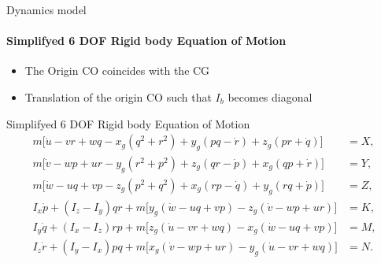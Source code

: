 \begin{frame}{Dynamics model}
	\framesubtitle{Simplifyed 6 DOF Rigid body Equation of Motion}
	\begin{itemize}
		\item The Origin CO coincides with the CG
		\item Translation of the origin CO such that $I_b$ becomes diagonal
	\end{itemize}
	\begin{block}{Simplifyed 6 DOF Rigid body Equation of Motion}
		\begin{align}
			m \big[ \dot{u} - vr + wq - x_g (q^2 + r^2) + y_g (pq - \dot{r}) + z_g (pr + \dot{q}) \big] &= X, \\
			m \big[ \dot{v} - wp + ur - y_g (r^2 + p^2) + z_g (qr - \dot{p}) + x_g (qp + \dot{r}) \big] &= Y, \\
			m \big[ \dot{w} - uq + vp - z_g (p^2 + q^2) + x_g (rp - \dot{q}) + y_g (rq + \dot{p}) \big] &= Z, \\
			I_x \dot{p} + (I_z - I_y) qr + m \big[ y_g (\dot{w} - uq + vp) - z_g (\dot{v} - wp + ur) \big] &= K, \\
			I_y \dot{q} + (I_x - I_z) rp + m \big[ z_g (\dot{u} - vr + wq) - x_g (\dot{w} - uq + vp) \big] &= M, \\
			I_z \dot{r} + (I_y - I_x) pq + m \big[ x_g (\dot{v} - wp + ur) - y_g (\dot{u} - vr + wq) \big] &= N.
		\end{align}
	\end{block}
\end{frame}


